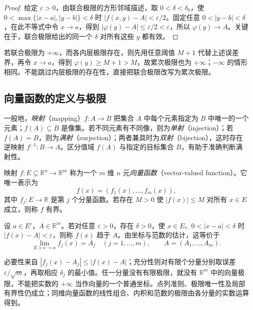 \documentclass[UTF8,12pt,a4paper,fontset=fandol]{ctexbook}
\begin{document}
\begin{proof}
给定 $\varepsilon>0$，由联合极限的方形邻域描述，取 $0<\delta<\delta_0$，使 $0<\max\{|x-a|,|y-b|\}<\delta$ 时 $|f(x,y)-A|<\varepsilon/2$。固定任意 $0<|y-b|<\delta$，在此不等式中令 $x\to a$，得到 $|\varphi(y)-A|\leq\varepsilon/2<\varepsilon$，所以 $\varphi(y)\to A$。关键在于，联合极限给出的同一个 $\delta$ 对所有这些 $y$ 都有效。
\end{proof}

若联合极限为 $+\infty$，而各内层极限存在，则先用任意阈值 $M+1$ 代替上述误差界，再令 $x\to a$，得到 $\varphi(y)\geq M+1>M$，故累次极限也为 $+\infty$；$-\infty$ 的情形相同。不能跳过内层极限的存在性，直接把联合极限改写为累次极限。

\subsection{向量函数的定义与极限}
\label{subsec:definition-and-limits-of-vector-functions}

一般地，\emph{映射}（mapping）$f:A\to B$ 把集合 $A$ 中每个元素指定为 $B$ 中唯一的一个元素；$f(A)\subseteq B$ 是像集。若不同元素有不同像，则为\emph{单射}（injection）；若 $f(A)=B$，则为\emph{满射}（surjection）；两者兼具时为\emph{双射}（bijection），这时存在逆映射 $f^{-1}:B\to A$。区分值域 $f(A)$ 与指定的目标集合 $B$，有助于准确判断满射性。

\begin{definition}
\label{def:multivariable-vector-valued-function}
映射 $f:E\subseteq\mathbb R^n\to\mathbb R^m$ 称为一个 $m$ 维 $n$ 元\emph{向量函数}（vector-valued function）。它唯一表示为
\[
    f(x)=(f_1(x),\ldots,f_m(x)),
\]
其中 $f_j:E\to\mathbb R$ 是第 $j$ 个分量函数。若存在 $M>0$ 使 $|f(x)|\leq M$ 对所有 $x\in E$ 成立，则称 $f$ 有界。
\end{definition}

\begin{definition}
\label{def:vector-valued-function-limit}
设 $a\in E'$，$A\in\mathbb R^m$。若对任意 $\varepsilon>0$，存在 $\delta>0$，使 $x\in E$、$0<|x-a|<\delta$ 时 $|f(x)-A|<\varepsilon$，则称 $f(x)$ 趋于 $A$。由坐标与范数的估计，这等价于
\[
    \lim_{E\ni x\to a}f_j(x)=A_j\quad(j=1,\ldots,m),\qquad
    A=(A_1,\ldots,A_m).
\]
\end{definition}

必要性来自 $|f_j(x)-A_j|\leq|f(x)-A|$；充分性则对有限个分量分别取误差 $\varepsilon/\sqrt m$，再取相应 $\delta_j$ 的最小值。任一分量没有有限极限，就没有 $\mathbb R^m$ 中的向量极限，不能把实数的 $+\infty$ 当作向量的一个普通坐标。点列准则、极限唯一性及局部有界性仍成立；同维向量函数的线性组合、内积和范数的极限由各分量的实数运算得到。
\end{document}

